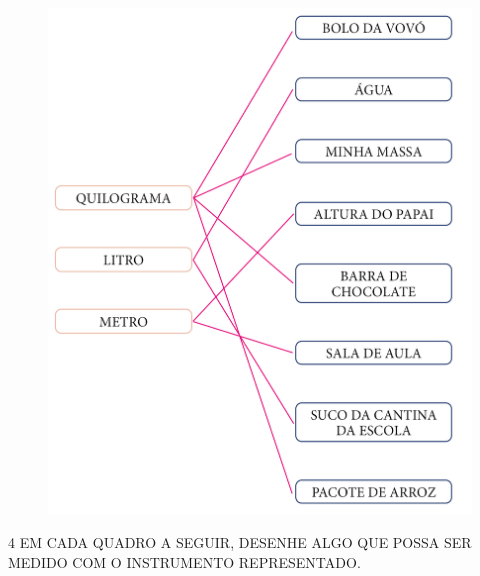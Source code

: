 \begin{figure}[H]
\centering
\includegraphics[width=\textwidth]{./media/SAEB_1ANO_MAT_FIGURA36.png}
\end{figure}


\num{4} EM CADA QUADRO A SEGUIR, DESENHE ALGO QUE POSSA SER MEDIDO COM O INSTRUMENTO REPRESENTADO.


